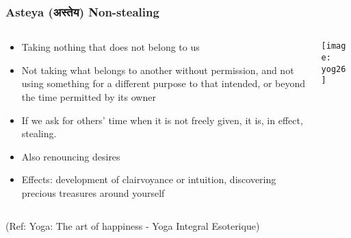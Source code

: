 \begin{frame}[fragile]\frametitle{Asteya (अस्तेय) Non-stealing}
   \begin{columns}
    \begin{column}[t]{0.7\linewidth}
	
	\begin{itemize}
	\item Taking nothing that does not belong to us
	\item Not taking what belongs to another without permission, and not using something for a different purpose to that intended, or beyond the time permitted by its owner
	\item If we  ask for others' time when it is not freely given, it is, in effect, stealing.
	\item Also renouncing desires
	\item Effects: development of clairvoyance or intuition, discovering precious  treasures  around yourself

	\end{itemize}
    \end{column}
    \begin{column}[t]{0.3\linewidth}	
\begin{center}
\texttt{[image: yog26]}

\end{center}
    \end{column}
  \end{columns}
  
  \tiny{(Ref: Yoga: The art of happiness - Yoga Integral Esoterique)}

\end{frame}

